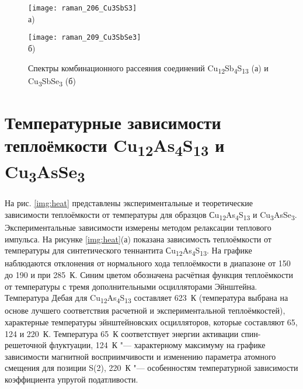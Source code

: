 \begin{figure}[p!]
  \begin{minipage}[ht]{0.9\linewidth}\centering
    \texttt{[image: raman\_206\_Cu3SbS3]} \\ а)
  \end{minipage}
  \vfill
  \begin{minipage}[ht]{0.9\linewidth}\centering
    \texttt{[image: raman\_209\_Cu3SbSe3]} \\ б)
  \end{minipage}

      \caption[Спектры комбинационного рассеяния соединений Cu\textsubscript{12}Sb\textsubscript{4}S\textsubscript{13} (а) и Cu\textsubscript{3}SbSe\textsubscript{3} (б)]{Спектры комбинационного рассеяния соединений Cu\textsubscript{12}Sb\textsubscript{4}S\textsubscript{13} (а) и Cu\textsubscript{3}SbSe\textsubscript{3} (б)}
    \label{img:raman2}
\end{figure}


\newpage

\section{Температурные зависимости теплоёмкости Cu\textsubscript{12}As\textsubscript{4}S\textsubscript{13} и Cu\textsubscript{3}AsSe\textsubscript{3}} \label{sect4_3}

На рис. \ref{img:heat} представлены экспериментальные и теоретические зависимости теплоёмкости  от температуры для образцов Сu\textsubscript{12}As\textsubscript{4}S\textsubscript{13} и Cu\textsubscript{3}AsSe\textsubscript{3}. Экспериментальные зависимости измерены методом релаксации теплового импульса.
На рисунке \ref{img:heat}(а) показана зависимость теплоёмкости от температуры для синтетического теннантита Сu\textsubscript{12}As\textsubscript{4}S\textsubscript{13}. На графике наблюдаются отклонения от нормального хода теплоёмкости в диапазоне от 150 до 190 и при 285~К. Синим цветом обозначена расчётная функция теплоёмкости от температуры с тремя дополнительными осцилляторами Эйнштейна. Температура Дебая для Cu\textsubscript{12}As\textsubscript{4}S\textsubscript{13} составляет 623~К (температура выбрана на основе лучшего соответствия расчетной  и экспериментальной  теплоёмкостей), характерные температуры эйнштейновских осцилляторов, которые составляют 65, 124 и 220~К. Температура 65~К соответствует энергии активации спин-решеточной флуктуации\cite{Gainov2008,Gainov_2006}, 124~К "--- характерному максимуму на графике зависимости магнитной восприимчивости и изменению параметра атомного смещения для позиции S(2), 220~К "--- особенностям температурной зависимости коэффициента упругой податливости\cite{bab_81}.

